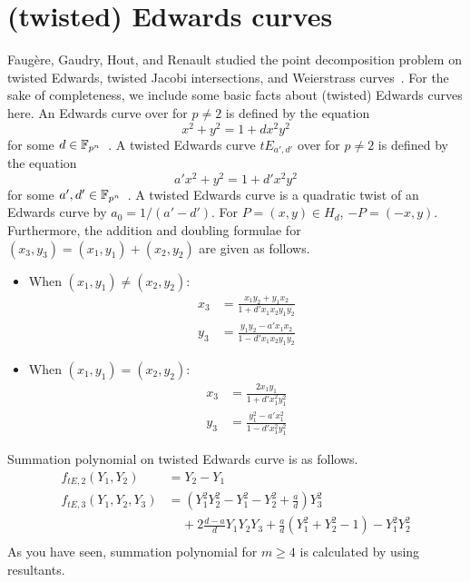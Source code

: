 %
%

\section{(twisted) Edwards curves}
\label{sec:twisted-edwards}


Faug\`ere, Gaudry, Hout, and Renault studied the point decomposition
problem on twisted Edwards, twisted Jacobi intersections, and
Weierstrass curves~\cite{DBLP:conf/eurocrypt/FaugereHJRV14}.
%
For the sake of completeness, we include some basic facts about
(twisted) Edwards curves here.
%
%
An Edwards curve over  for $p\neq 2$ is defined by the
equation \begin{equation*}
  x^2+y^2=1+dx^2y^2 \label{eq:edwards-curve} \end{equation*} for some
$d\in\mathbb F_{p^n}$~\cite{DBLP:journals/iacr/BernsteinL07}.
%
A twisted Edwards curve $tE_{a',d'}$ over  for $p\neq 2$ is
defined by the equation \begin{equation}
  a'x^2+y^2=1+d'x^2y^2 \label{eq:twisted-edwards-curve} \end{equation}
for some $a',d'\in\mathbb F_{p^n}$~\cite{DBLP:journals/iacr/BernsteinBJLP08}.
%
A twisted Edwards curve is a quadratic twist of an Edwards curve by
$a_0=1/(a'-d')$.
%
For $P=(x,y)\in H_d$, $-P=(-x,y)$.
%
Furthermore, the addition and doubling formulae for
$(x_3,y_3)=(x_1,y_1)+(x_2,y_2)$ are given as follows.
%
\begin{itemize}
\item When $(x_1,y_1)\neq(x_2,y_2)$:
  \begin{align*}
    x_3 & = \frac{x_1y_2 + y_1x_2}{1 + d'x_1x_2y_1y_2} \\
    y_3 & = \frac{y_1y_2 - a'x_1x_2}{1 - d'x_1x_2y_1y_2}
  \end{align*}
\item When $(x_1,y_1)=(x_2,y_2)$:
  \begin{align*}
    x_3 & = \frac{2x_1y_1}{1 + d'x_1^2y_1^2} \\
    y_3 & = \frac{y_1^2 - a'x_1^2}{1 - d'x_1^2y_1^2}
  \end{align*}
\end{itemize}

Summation polynomial on twisted Edwards curve is as follows.
%
\begin{align*}
  f_{tE, 2}(Y_1, Y_2) &= Y_2-Y_1 \\
  f_{tE, 3}(Y_1, Y_2, Y_3) &=
    \left( Y_1^2Y_2^2-Y_1^2-Y_2^2+\frac{a}{d} \right)Y_3^2  \\
    &~~~~~ + 2\frac{d-a}{d}Y_1Y_2Y_3 + \frac{a}{d}\left(Y_1^2+Y_2^2-1\right)-Y_1^2Y_2^2\\
\end{align*}
%
As you have seen, summation polynomial for $m\geq4$ is 
calculated by using resultants.


